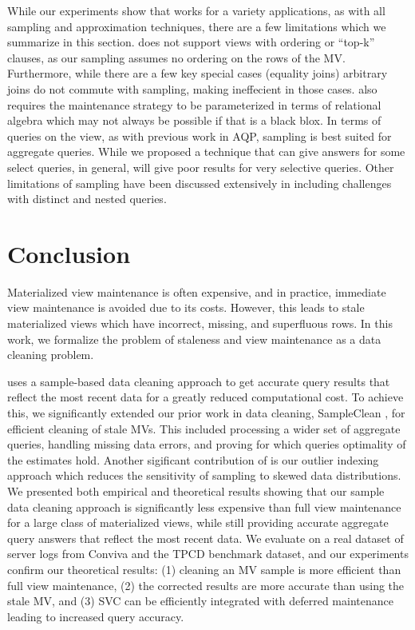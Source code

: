 While our experiments show that \svc works for a variety applications, as with all sampling and approximation techniques, there are a few limitations which we summarize in this section.
\svc does not support views with ordering or ``top-k'' clauses, as our sampling assumes no ordering on the rows of the MV.
Furthermore, while there are a few key special cases (equality joins) arbitrary joins do not commute with sampling, making \svc ineffecient in those cases.
\svc also requires the maintenance strategy to be parameterized in terms of relational algebra which may not always be possible if that is a black blox.
In terms of queries on the view, as with previous work in AQP, sampling is best suited for aggregate queries.
While we proposed a technique that can give answers for some select queries, in general, \svc will give poor results for very selective queries.
Other limitations of sampling have been discussed extensively in \cite{DBLP:journals/ftdb/CormodeGHJ12} including challenges with distinct and nested queries.

\vspace{-1em}
\section{Conclusion}\label{conclusion}
\vspace{-.3em}
Materialized view maintenance is often expensive, and in practice, immediate view maintenance is avoided due to its costs.
However, this leads to stale materialized views which have incorrect, missing, and superfluous rows.
In this work, we formalize the problem of staleness and view maintenance as a data cleaning problem.

\svc uses a sample-based data cleaning approach to get accurate query results that reflect the most recent data for a greatly reduced computational cost.
To achieve this, we significantly extended our prior work in data cleaning, SampleClean \cite{wang1999sample}, for efficient cleaning of stale MVs. 
This included processing a wider set of aggregate queries, handling missing data errors, and proving for which queries optimality of the estimates hold.
Another sigificant contribution of \svc is our outlier indexing approach which reduces the sensitivity of sampling to skewed data distributions.
We presented both empirical and theoretical results showing that our sample data cleaning approach is significantly less expensive than full view maintenance for a large class of materialized views, while still providing accurate aggregate query answers that reflect the most recent data.
We evaluate \svc on a real dataset of server logs from Conviva and the TPCD benchmark dataset, and our experiments confirm our theoretical results: (1) cleaning an MV sample is more efficient than full view maintenance, (2) the corrected results are more accurate than using the stale MV, and (3) SVC can be efficiently integrated with deferred maintenance leading to increased query accuracy. 





